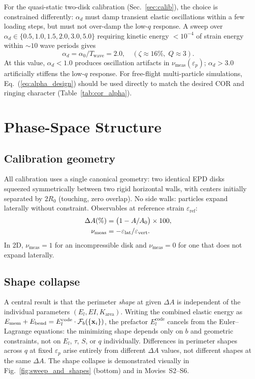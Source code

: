 \documentclass[aps,pre,twocolumn,floatfix,longbibliography]{revtex4-2}
\newcommand{\El}{E_l}
\newcommand{\Elc}{E_l^{\mathrm{code}}}
\newcommand{\Karea}{K_{\mathrm{area}}}
\newcommand{\numes}{\nu_{\mathrm{meas}}}
\newcommand{\dA}{\Delta A}
\newcommand{\eref}{\varepsilon_{\mathrm{ref}}}
\newcommand{\ep}{\varepsilon_p}
\begin{document}
For the quasi-static two-disk calibration (Sec.~\ref{sec:calib}), the
choice is constrained differently: $\alpha_d$ must damp transient elastic
oscillations within a few loading steps, but must not over-damp the
low-$q$ response.  A sweep over $\alpha_d \in \{0.5, 1.0, 1.5, 2.0, 3.0, 5.0\}$
requiring kinetic energy $< 10^{-4}$ of strain energy within $\sim 10$
wave periods gives
\begin{equation}
  \boxed{\alpha_d = \alpha_0 / T_\text{wave} = 2.0,
    \quad (\zeta \approx 16\%, \; Q \approx 3).}
\label{eq:alpha0}
\end{equation}
At this value, $\alpha_d < 1.0$ produces oscillation artifacts in
$\numes(\ep)$; $\alpha_d > 3.0$ artificially stiffens the low-$q$ response.
For free-flight multi-particle simulations, Eq.~(\ref{eq:alpha_design})
should be used directly to match the desired COR and ringing character
(Table~\ref{tab:cor_alpha}).

\section{Phase-Space Structure}
\label{sec:phasespace}

\subsection{Calibration geometry}

All calibration uses a single canonical geometry: two identical EPD disks squeezed
symmetrically between two rigid horizontal walls, with centers initially separated
by $2R_0$ (touching, zero overlap).  No side walls: particles expand laterally
without constraint.  Observables at reference strain $\eref$:
\begin{align}
  \dA(\%) &= \bigl(1 - A/A_0\bigr) \times 100,
  \label{eq:dA}\\
  \numes &= -\varepsilon_{\rm lat}/\varepsilon_{\rm vert}.
  \label{eq:nu}
\end{align}
In 2D, $\numes = 1$ for an incompressible disk and $\numes = 0$ for one that
does not expand laterally.

\subsection{Shape collapse}

A central result is that the perimeter \emph{shape} at given $\dA$ is independent
of the individual parameters $(\El, EI, \Karea)$.  Writing the combined elastic
energy as $E_{\rm mem} + E_{\rm bend} = \Elc \cdot \mathcal{F}_b(\{\mathbf{x}_i\})$,
the prefactor $\Elc$ cancels from the Euler--Lagrange equations: the minimizing
shape depends only on $b$ and geometric constraints, not on $\El$, $\tau$, $S$,
or $q$ individually.  Differences in perimeter shapes across $q$ at fixed $\ep$
arise entirely from different $\dA$ values, not different shapes at the same $\dA$.
The shape collapse is demonstrated visually in Fig.~\ref{fig:sweep_and_shapes}
(bottom) and in Movies~S2--S6.
\end{document}
